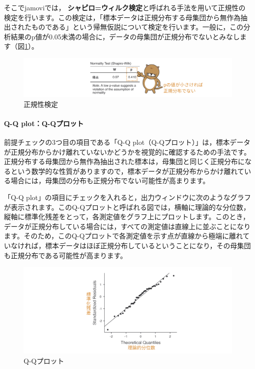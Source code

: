 \documentclass[
  12pt,
  a5jpaper,
  lualatex, ja=standard]{bxjsbook}
\renewcommand{\emph}[1]{\textbf{\color{emph} #1}}
\begin{document}
そこでjamoviでは，\emph{シャピロ=ウィルク検定}と呼ばれる手法を用いて正規性の検定を行います。この検定は，「標本データは正規分布する母集団から無作為抽出されたものである」という帰無仮説について検定を行います。一般に，この分析結果のp値が0.05未満の場合に，データの母集団が正規分布でないとみなします（図\ref{fig:ttests-normality}）。

\begin{figure}[!ht]

{\centering \includegraphics[width=1\linewidth]{images/ttests/normality} 

}

\caption{正規性検定}\label{fig:ttests-normality}
\end{figure}

\hypertarget{q-q-plotq-qux30d7ux30edux30c3ux30c8}{%
\paragraph*{Q-Q plot：Q-Qプロット}\label{q-q-plotq-qux30d7ux30edux30c3ux30c8}}

前提チェックの3つ目の項目である「Q-Q plot（Q-Qプロット）」は，標本データが正規分布からかけ離れていないかどうかを視覚的に確認するための手法です。正規分布する母集団から無作為抽出された標本は，母集団と同じく正規分布になるという数学的な性質がありますので，標本データが正規分布からかけ離れている場合には，母集団の分布も正規分布でない可能性が高まります。

「Q-Q plot」の項目にチェックを入れると，出力ウィンドウに次のようなグラフが表示されます。このQ-Qプロットと呼ばれる図では，横軸に理論的な分位数，縦軸に標準化残差をとって，各測定値をグラフ上にプロットします。このとき，データが正規分布している場合には，すべての測定値は直線上に並ぶことになります。そのため，このQ-Qプロットで各測定値を示す点が直線から極端に離れていなければ，標本データはほぼ正規分布しているということになり，その母集団も正規分布である可能性が高まります。

\begin{figure}[!ht]

{\centering \includegraphics[width=1\linewidth]{images/ttests/qqplot} 

}

\caption{Q-Qプロット}\label{fig:ttests-qqplot}
\end{figure}
\end{document}
